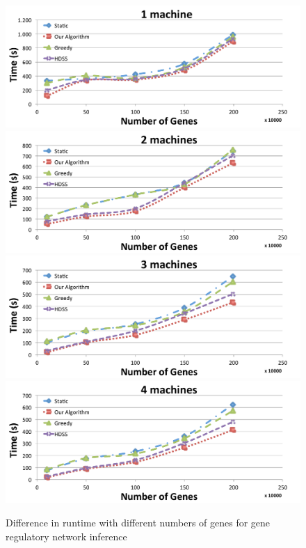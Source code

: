 \documentclass[journal]{IEEEtran}
\begin{document}
\begin{figure}[htb]
	\begin{center}
	\centering
		\includegraphics[scale=0.3]{1machineGenes.pdf} \quad
		\includegraphics[scale=0.3]{2machineGenes.pdf} \quad
		\includegraphics[scale=0.3]{3machineGenes.pdf} \quad
		\includegraphics[scale=0.3]{4machineGenes.pdf} 
	\caption{Difference in runtime with different numbers of genes for gene regulatory network inference}
	\label{fig:Gene}
	\end{center}
\end{figure}
\end{document}
